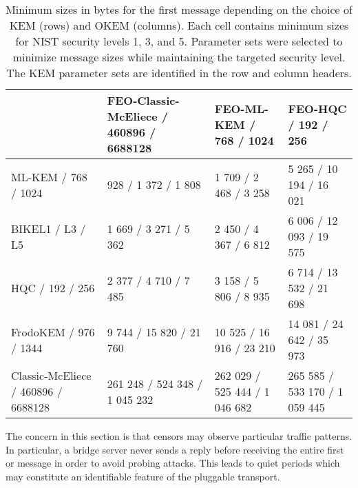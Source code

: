 \begin{table}
    \centering \scriptsize
    \begin{tabular}{@{} L{0.25\textwidth-\tabcolsep} | L{0.25\tabcolsep} L{0.25\tabcolsep} L{0.25\textwidth-\tabcolsep} @{}}
        & FEO-Classic-McEliece / 460896 / 6688128
        & FEO-ML-KEM / 768 / 1024
        & FEO-HQC / 192 / 256
        \\ \hline
    ML-KEM / 768 / 1024
        & 928 / 1 372 / 1 808
        & 1 709 / 2 468 / 3 258
        & 5 265 / 10 194 / 16 021        \\
    BIKE\newline L1 / L3 / L5
        & 1 669 / 3 271 / 5 362
        & 2 450 / 4 367 / 6 812
        & 6 006 / 12 093 / 19 575        \\
    HQC / 192 / 256
        & 2 377 / 4 710 / 7 485
        & 3 158 / 5 806 / 8 935
        & 6 714 / 13 532 / 21 698        \\
    FrodoKEM / 976 / 1344
        & 9 744 / 15 820 / 21 760
        & 10 525 / 16 916 / 23 210
        & 14 081 / 24 642 / 35 973       \\
    Classic-McEliece / 460896 / 6688128
        & \tiny 261 248 / 524 348 / 1 045 232
        & \tiny 262 029 / 525 444 / 1 046 682
        & \tiny 265 585 / 533 170 / 1 059 445
    \end{tabular}
    \caption[
        Minimum sizes in bytes for the first \drivel{} message depending on the choice of KEM and OKEM
    ]{
        Minimum sizes in bytes for the first \drivel{} message depending on the choice of KEM (rows) and OKEM (columns). Each cell contains minimum sizes for NIST security levels 1, 3, and 5. Parameter sets were selected to minimize message sizes while maintaining the targeted security level. The KEM parameter sets are identified in the row and column headers.
    }
    \label{tab:frag-msg-sizes}
\end{table}

The concern in this section is that censors may observe particular traffic patterns. In particular, a bridge server never sends a reply before receiving the entire first \drivel{} or \obfsfour{} message in order to avoid probing attacks. This leads to quiet periods which may constitute an identifiable feature of the pluggable transport.

